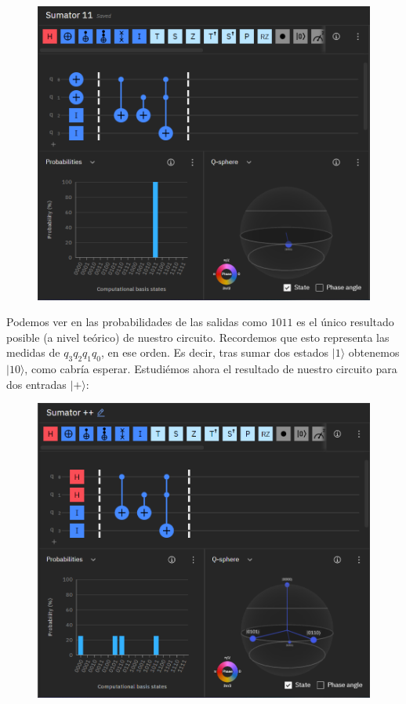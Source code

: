 \documentclass[11pt]{article}
\newcommand{\ra}{\rangle}
\theoremstyle{plain}
\begin{document}
\begin{figure}[H]
	\centering
	\includegraphics[scale=0.7]{figures/sumator_11.png}
\end{figure}

Podemos ver en las probabilidades de las salidas como $1011$ es el único resultado posible (a nivel teórico) de nuestro circuito. Recordemos que esto representa las medidas de $q_3 q_2 q_1 q_0$, en ese orden. Es decir, tras sumar dos estados $|1\ra$ obtenemos $|10\ra$, como cabría esperar. Estudiémos ahora el resultado de nuestro circuito para dos entradas $|+\ra$:

\begin{figure}[H]
	\centering
	\includegraphics[scale=0.7]{figures/sumator_++.png}
\end{figure}
\end{document}
